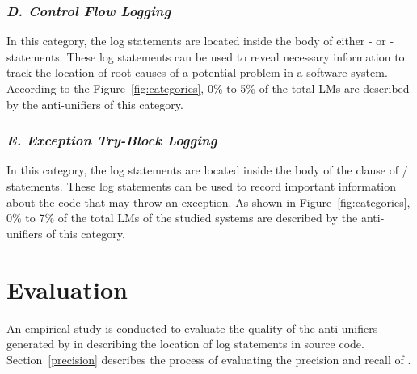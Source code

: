 \subsubsection{\emph{D. Control Flow Logging}}  \label{Control flow logging}
In this category, the log statements are located inside the body of either - or - statements. These log statements can be used to reveal necessary information to track the location of root causes of a potential problem in a software system. According to the Figure~\ref{fig:categories}, 0\% to 5\% of the total LMs are described by the anti-unifiers of this category.


\subsubsection{\emph{E. Exception Try-Block Logging}}  \label{Exception try-block logging}
In this category, the log statements are located inside the body of the  clause of / statements. These log statements can be used to record important information about the code that may throw an exception. As shown in Figure~\ref{fig:categories}, 0\% to 7\% of the total LMs of the studied systems are described by the anti-unifiers of this category.


\section{Evaluation}  \label{evaluation}

An empirical study is conducted to evaluate the quality of the anti-unifiers generated by  in describing the location of log statements in source code. Section~\ref{precision} describes the process of evaluating the precision and recall of .


